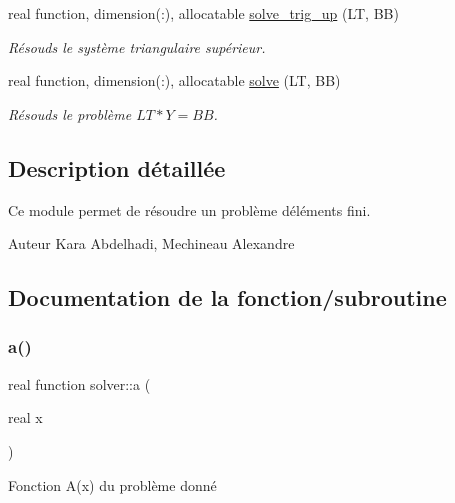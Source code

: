 \begin{DoxyCompactItemize}
real function, dimension(\+:), allocatable \hyperlink{namespacesolver_a08b8f70c86d7bf39b32ce8fdcc872fd4}{solve\+\_\+trig\+\_\+up} (LT, BB)
\begin{DoxyCompactList}\small\item\em Résouds le système triangulaire supérieur. \end{DoxyCompactList}\item 
real function, dimension(\+:), allocatable \hyperlink{namespacesolver_af3691d2059a024a82bab7751a99e6006}{solve} (LT, BB)
\begin{DoxyCompactList}\small\item\em Résouds le problème $ LT*Y = BB$. \end{DoxyCompactList}\end{DoxyCompactItemize}


\subsection{Description détaillée}
Ce module permet de résoudre un problème d\textquotesingle{}éléments fini. 

\begin{DoxyAuthor}{Auteur}
Kara Abdelhadi, Mechineau Alexandre 
\end{DoxyAuthor}


\subsection{Documentation de la fonction/subroutine}
\mbox{\label{namespacesolver_ab0081bb7880652eb26e65994f13fcb54}} 
\subsubsection{\texorpdfstring{a()}{a()}}
{\footnotesize\ttfamily real function solver\+::a (\begin{DoxyParamCaption}\item[{real}]{x }\end{DoxyParamCaption})}



Fonction A(x) du problème donné 


